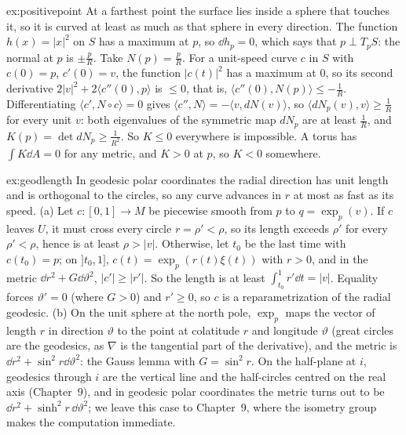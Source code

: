 \begin{solution}{ex:positivepoint}
\idea At a farthest point the surface lies inside a sphere that touches it, so it is curved at least as much as that sphere in every direction.
\writeup The function $h(x)=|x|^2$ on $S$ has a maximum at $p$, so $\dd h_p=0$, which says that $p\perp T_pS$: the normal at $p$ is $\pm\frac pR$. Take $N(p)=\frac pR$. For a unit-speed curve
$c$ in $S$ with $c(0)=p$, $c'(0)=v$, the function $|c(t)|^2$ has a maximum at $0$, so its second derivative $2|v|^2+2\langle c''(0),p\rangle$ is $\le0$, that is,
$\langle c''(0),N(p)\rangle\le-\frac1R$. Differentiating $\langle c',N\circ c\rangle=0$ gives $\langle c'',N\rangle=-\langle v,dN(v)\rangle$, so $\langle dN_p(v),v\rangle\ge\frac1R$ for every unit $v$: both eigenvalues of the
symmetric map $dN_p$ are at least $\frac1R$, and $K(p)=\det dN_p\ge\frac1{R^2}$. So $K\le0$ everywhere is impossible. A torus has $\int K\dd A=0$ for any metric, and $K>0$ at $p$, so $K<0$
somewhere.
\end{solution}

\begin{solution}{ex:geodlength}
\idea In geodesic polar coordinates the radial direction has unit length and is orthogonal to the circles, so any curve advances in $r$ at most as fast as its speed.
\writeup (a) Let $c\colon[0,1]\to M$ be piecewise smooth from $p$ to $q=\exp_p(v)$. If $c$ leaves $U$, it must cross every circle $r=\rho'<\rho$, so its length exceeds $\rho'$ for every
$\rho'<\rho$, hence is at least $\rho>|v|$. Otherwise, let $t_0$ be the last time with $c(t_0)=p$; on $]t_0,1]$, $c(t)=\exp_p(r(t)\xi(t))$ with $r>0$, and in the metric
$\dd r^2+G\dd\vartheta^2$, $|c'|\ge|r'|$. So the length is at least $\int_{t_0}^1r'\dd t=|v|$. Equality forces $\vartheta'=0$ (where $G>0$) and $r'\ge0$, so $c$ is a reparametrization of the radial
geodesic. (b) On the unit sphere at the north pole, $\exp_p$ maps the vector of length $r$ in direction $\vartheta$ to the point at colatitude $r$ and longitude $\vartheta$ (great circles
are the geodesics, as $\nabla$ is the tangential part of the derivative), and the metric is $\dd r^2+\sin^2r\dd\vartheta^2$: the Gauss lemma with $G=\sin^2r$. On the half-plane at $i$,
geodesics through $i$ are the vertical line and the half-circles centred on the real axis (Chapter~9), and in geodesic polar coordinates the metric turns out to be
$\dd r^2+\sinh^2r\,\dd\vartheta^2$; we leave this case to Chapter~9, where the isometry group makes the computation immediate.
\end{solution}

